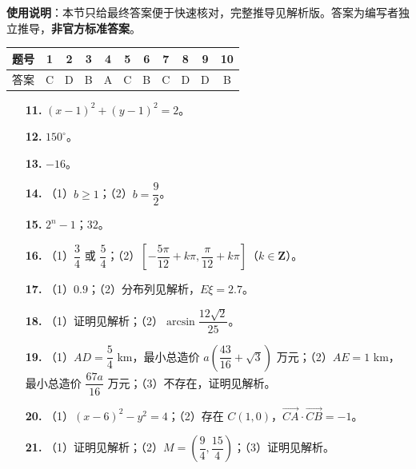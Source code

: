 
\begin{gknotice}
\textbf{使用说明}：本节只给最终答案便于快速核对，完整推导见解析版。答案为编写者独立推导，\textbf{非官方标准答案}。
\end{gknotice}

\begin{center}\begin{tabular}{ccccccccccc}
\toprule
题号 & 1 & 2 & 3 & 4 & 5 & 6 & 7 & 8 & 9 & 10 \\
\midrule
答案 & C & D & B & A & C & B & C & D & D & B \\
\bottomrule
\end{tabular}\end{center}

\begin{itemize}[leftmargin=2.6em]
  \item[\textbf{11.}] $(x-1)^2+(y-1)^2=2$。
  \item[\textbf{12.}] $150^\circ$。
  \item[\textbf{13.}] $-16$。
  \item[\textbf{14.}] （1）$b\geqslant1$；（2）$b=\dfrac92$。
  \item[\textbf{15.}] $2^n-1$；$32$。
\end{itemize}

\begin{itemize}[leftmargin=2.6em]
  \item[\textbf{16.}] （1）$\dfrac34$ 或 $\dfrac54$；（2）$\left[-\dfrac{5\pi}{12}+k\pi,\dfrac{\pi}{12}+k\pi\right]$（$k\in\mathbf Z$）。
  \item[\textbf{17.}] （1）$0.9$；（2）分布列见解析，$E\xi=2.7$。
  \item[\textbf{18.}] （1）证明见解析；（2）$\arcsin\dfrac{12\sqrt2}{25}$。
  \item[\textbf{19.}] （1）$AD=\dfrac54$ km，最小总造价 $a\left(\dfrac{43}{16}+\sqrt3\right)$ 万元；（2）$AE=1$ km，最小总造价 $\dfrac{67a}{16}$ 万元；（3）不存在，证明见解析。
  \item[\textbf{20.}] （1）$(x-6)^2-y^2=4$；（2）存在 $C(1,0)$，$\overrightarrow{CA}\cdot\overrightarrow{CB}=-1$。
  \item[\textbf{21.}] （1）证明见解析；（2）$M=\left(\dfrac94,\dfrac{15}4\right)$；（3）证明见解析。
\end{itemize}
